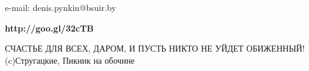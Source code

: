 \begin{frame}
\titlepage
\begin{center}
e-mail: denis.pynkin@bsuir.by\\
\end{center}
\begin{center}
{\bfseries http://goo.gl/32cTB}

{\tiny СЧАСТЬЕ ДЛЯ ВСЕХ, ДАРОМ, И ПУСТЬ НИКТО НЕ УЙДЕТ ОБИЖЕННЫЙ!\\
(c)Стругацкие, Пикник на обочине}
\end{center}
\end{frame}
